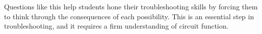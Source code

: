 





Questions like this help students hone their troubleshooting skills by forcing them to think through the consequences of each possibility.  This is an essential step in troubleshooting, and it requires a firm understanding of circuit function.




